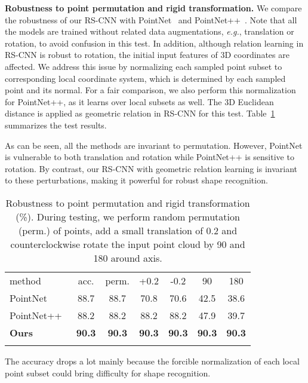 \documentclass[10pt,twocolumn,letterpaper]{article}
\begin{document}
\vspace{10pt}
\noindent \textbf{Robustness to point permutation and rigid transformation.} We compare the robustness of our RS-CNN with PointNet~\cite{c1_pointnet} and PointNet++~\cite{c2_pointnet2}. Note that all the models are trained without related data augmentations, \textit{e.g.}, translation or rotation, to avoid confusion in this test. In addition, although relation learning in RS-CNN is robust to rotation, the initial input features of 3D coordinates are affected. We address this issue by normalizing each sampled point subset to corresponding local coordinate system, which is determined by each sampled point and its normal. For a fair comparison, we also perform this normalization for PointNet++, as it learns over local subsets as well. The 3D Euclidean distance is applied as geometric relation  in RS-CNN for this test. Table~\ref{Tab7:robust_invariant} summarizes the test results.

As can be seen, all the methods are invariant to permutation. However, PointNet is vulnerable to both translation and rotation while PointNet++ is sensitive to rotation. By contrast, our RS-CNN with geometric relation learning is invariant to these perturbations, making it powerful for robust shape recognition.

\begin{table}[t]
  \centering
  \footnotesize
\caption{Robustness to point permutation and rigid transformation (\%). During testing, we perform random permutation (perm.) of points, add a small translation of 0.2 and counterclockwise rotate the input point cloud by 90 and 180 around  axis.}
\begin{threeparttable}
  \begin{tabular}{l|c|ccccc}
  \Xhline{0.8pt}
  method & acc. & perm. & +0.2 & -0.2 & 90 & 180 \\
\Xhline{0.5pt}
  PointNet~\cite{c1_pointnet} & 88.7 & 88.7 & 70.8 & 70.6 & 42.5 & 38.6 \\
  PointNet++~\cite{c2_pointnet2} & 88.2 & 88.2 & 88.2 & 88.2 & 47.9 & 39.7 \\
  \textbf{Ours} & \textbf{90.3} & \textbf{90.3} & \textbf{90.3} & \textbf{90.3} & \textbf{90.3} & \textbf{90.3} \\
  \Xhline{0.8pt}
  \end{tabular}
  \begin{tablenotes}
        \footnotesize
        \item[]The accuracy drops a lot mainly because the forcible normalization of each local point subset could bring difficulty for shape recognition.
  \end{tablenotes}
  \end{threeparttable}
  \label{Tab7:robust_invariant}
\end{table}
\end{document}
